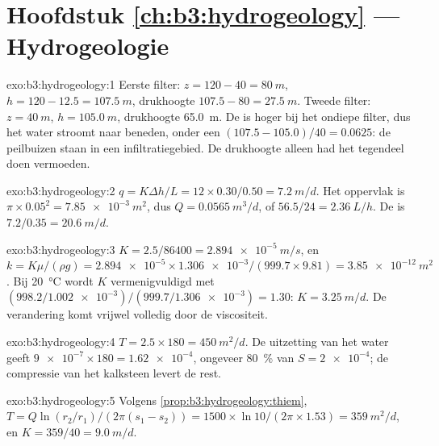 \section*{Hoofdstuk \ref{ch:b3:hydrogeology} --- Hydrogeologie}

\begin{solution}{exo:b3:hydrogeology:1}
Eerste filter: $z = 120 - 40 = \qty{80}{m}$, $h = 120 - 12.5 =
\qty{107.5}{m}$, drukhoogte $107.5 - 80 = \qty{27.5}{m}$. Tweede
filter: $z = \qty{40}{m}$, $h = \qty{105.0}{m}$, drukhoogte
\qty{65.0}{m}. De  is hoger bij het ondiepe filter, dus het water
stroomt naar beneden, onder een  $(107.5 - 105.0)/40 = \num{0.0625}$:
de peilbuizen staan in een infiltratiegebied. De drukhoogte alleen
had het tegendeel doen vermoeden.
\end{solution}

\begin{solution}{exo:b3:hydrogeology:2}
$q = K\Delta h/L = 12\times0.30/0.50 = \qty{7.2}{m/d}$. Het oppervlak is
$\pi\times0.05^2 = \qty{7.85e-3}{m^2}$, dus $Q = \qty{0.0565}{m^3/d}$, of
$56.5/24 = \qty{2.36}{L/h}$. De  is $7.2/0.35 =
\qty{20.6}{m/d}$.
\end{solution}

\begin{solution}{exo:b3:hydrogeology:3}
$K = 2.5/86400 = \qty{2.894e-5}{m/s}$, en $k = K\mu/(\rho g) =
\num{2.894e-5}\times\num{1.306e-3}/(999.7\times9.81) =
\qty{3.85e-12}{m^2}$. Bij \qty{20}{\celsius} wordt $K$ vermenigvuldigd met
$(998.2/\num{1.002e-3})/(999.7/\num{1.306e-3}) = \num{1.30}$: $K =
\qty{3.25}{m/d}$. De verandering komt vrijwel volledig door de viscositeit.
\end{solution}

\begin{solution}{exo:b3:hydrogeology:4}
$T = 2.5\times180 = \qty{450}{m^2/d}$. De uitzetting van het water geeft
$\num{9e-7}\times180 = \num{1.62e-4}$, ongeveer \qty{80}{\percent} van $S =
\num{2e-4}$; de compressie van het kalksteen levert de rest.
\end{solution}

\begin{solution}{exo:b3:hydrogeology:5}
Volgens \cref{prop:b3:hydrogeology:thiem}, $T = Q\ln(r_2/r_1)/(2\pi(s_1 -
s_2)) = 1500\times\ln10/(2\pi\times1.53) = \qty{359}{m^2/d}$, en $K =
359/40 = \qty{9.0}{m/d}$.
\end{solution}

